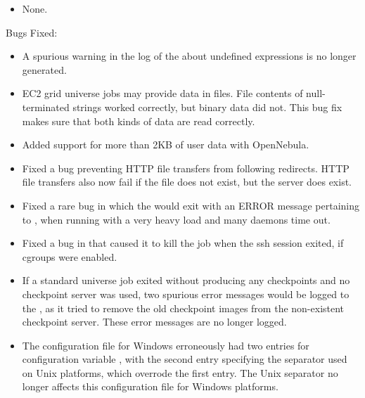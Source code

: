 \begin{itemize}

\item None.

\end{itemize}

\noindent Bugs Fixed:

\begin{itemize}

\item A spurious warning in the log of the  
about undefined  expressions
is no longer generated.

\item EC2 grid universe jobs may provide data in files.
File contents of null-terminated strings worked correctly,
but binary data did not.
This bug fix makes sure that both kinds of data are read correctly.

\item Added support for more than 2KB of user data with OpenNebula.

\item Fixed a bug preventing HTTP file transfers from following redirects.
HTTP file transfers also now fail if the file does not exist,
but the server does exist.

\item Fixed a rare bug in which the  would exit
with an ERROR message pertaining to ,
when running with a very heavy load and many  daemons
time out.

\item Fixed a bug in 
that caused it to kill the job when the ssh session exited,
if cgroups were enabled.

\item If a standard universe job exited without producing any checkpoints 
and no checkpoint server was used, 
two spurious error messages would be logged to the , 
as it tried to remove the old checkpoint images from the 
non-existent checkpoint server. 
These error messages are no longer logged.

\item The configuration file for Windows erroneously had two entries
for configuration variable ,
with the second entry specifying the
separator used on Unix platforms, which overrode the first entry. 
The Unix separator no longer affects this configuration file
for Windows platforms.


\end{itemize}
